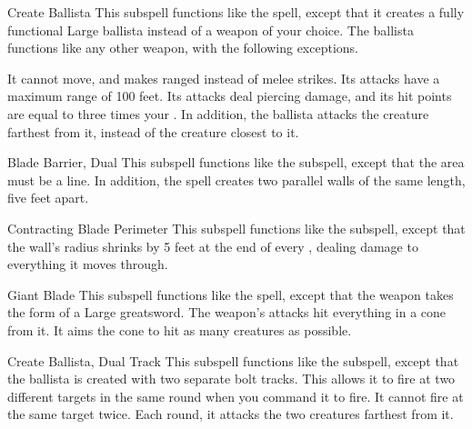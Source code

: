 \begin{ability}[\nth{2}]{Create Ballista}
This subspell functions like the  spell, except that it creates a fully functional Large ballista instead of a weapon of your choice.
The ballista functions like any other weapon, with the following exceptions.

It cannot move, and makes ranged  instead of melee strikes.
Its attacks have a maximum range of 100 feet.
Its attacks deal piercing damage, and its hit points are equal to three times your .
In addition, the ballista attacks the creature farthest from it, instead of the creature closest to it.
\end{ability}
\vspace{0.25em}



\begin{ability}[\nth{3}]{Blade Barrier, Dual}
This subspell functions like the  subspell, except that the area must be a line.
In addition, the spell creates two parallel walls of the same length, five feet apart.
\end{ability}
\vspace{0.25em}



\begin{ability}[\nth{3}]{Contracting Blade Perimeter}
This subspell functions like the  subspell, except that the wall's radius shrinks by 5 feet at the end of every , dealing damage to everything it moves through.
\end{ability}
\vspace{0.25em}



\begin{ability}[\nth{3}]{Giant Blade}
This subspell functions like the  spell, except that the weapon takes the form of a Large greatsword.
The weapon's attacks hit everything in a \areasmall cone from it.
It aims the cone to hit as many creatures as possible.
\end{ability}
\vspace{0.25em}



\begin{ability}[\nth{4}]{Create Ballista, Dual Track}
This subspell functions like the  subspell, except that the ballista is created with two separate bolt tracks.
This allows it to fire at two different targets in the same round when you command it to fire.
It cannot fire at the same target twice.
Each round, it attacks the two creatures farthest from it.
\end{ability}
\vspace{0.25em}



